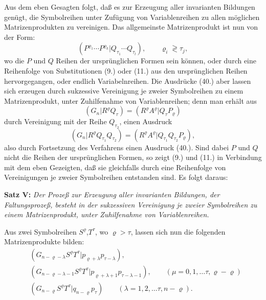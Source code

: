 \documentclass[12pt,a4paper]{article}
\begin{document}
Aus dem eben Gesagten folgt, daß es zur Erzeugung aller invarianten Bildungen genügt, die Symbolreihen unter Zufügung von Variablenreihen zu allen möglichen Matrizenprodukten zu vereinigen. Das allgemeinste Matrizenprodukt ist nun von der Form:
\begin{equation}\tag{40}
(P^{\varrho_{1}} \cdots P^{\varrho_{k}} | Q_{\tau_{1}} \cdots Q_{\tau_{l}}), \qquad \varrho_{i} \gtrless \tau_{j},
\end{equation}
wo die $P$ und $Q$ Reihen der ursprünglichen Formen sein können, oder durch eine Reihenfolge von Substitutionen (9.) oder (11.) aus den ursprünglichen Reihen hervorgegangen, oder endlich Variabelnreihen. Die Ausdrücke (40.) aber lassen sich erzeugen durch sukzessive Vereinigung je zweier Symbolreihen zu einem Matrizenprodukt, unter Zuhilfenahme von Variablenreihen; denn man erhält aus
\begin{equation*}
(G_{n} | R^{\varrho} Q_{\tau}) = (R^{\varrho} A^{\varrho} | Q_{\tau} P_{\varrho})
\end{equation*}
durch Vereinigung mit der Reihe $Q_{\tau_{2}}$, einen Ausdruck
\begin{equation*}
(G_{n} | R^{\varrho} Q_{\tau_{1}} Q_{\tau_{2}}) = (R^{\varrho} A^{\varrho} | Q_{\tau_{1}} Q_{\tau_{2}} P_{\varrho}),
\end{equation*}
also durch Fortsetzung des Verfahrens einen Ausdruck (40.). Sind dabei $P$ und $Q$ nicht die Reihen der ursprünglichen Formen, so zeigt (9.) und (11.) in Verbindung mit dem eben Gezeigten, daß sie gleichfalls durch eine Reihenfolge von Vereinigungen je zweier Symbolreihen entstanden sind. Es folgt daraus:

\medskip
\textbf{Satz V:} \textit{Der Prozeß zur Erzeugung aller invarianten Bildungen, der Faltungsprozeß, besteht in der sukzessiven Vereinigung je zweier Symbolreihen zu einem Matrizenprodukt, unter Zuhilfenahme von Variablenreihen.}
\medskip

Aus zwei Symbolreihen $S^{\varrho}$,$T^{\tau}$, wo $\varrho > \tau$, lassen sich nun die folgenden Matrizenprodukte bilden:
\begin{align}\tag{41}
&(G_{n-\varrho-\lambda} S^{\varrho} T^{\tau} | p_{\varrho+\lambda} p_{\tau-\lambda}), \\ \tag{42}
&(G_{n-\varrho-\lambda-1} S^{\varrho} T^{\tau} | p_{\varrho+\lambda+1} p_{\tau-\lambda-1}), \qquad (\mu = 0, 1, \ldots \tau, \varrho-\varrho) \\ \tag{43}
&(G_{n-\varrho} S^{\varrho} T^{\tau} | q_{n-\varrho} p_{\tau}) \qquad (\lambda = 1, 2, \ldots \tau, n-\varrho).
\end{align}
\end{document}
